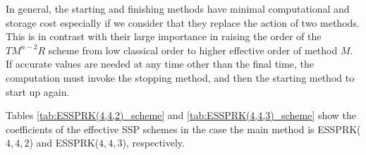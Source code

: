 In general, the starting and finishing methods have minimal computational and storage cost 
especially if we consider that they replace the action of two methods. 
This is in contrast with their large importance in raising the order of the $TM^{n-2}R$ scheme 
from low classical order to higher effective order of method $M$.
If accurate values are needed at any time other than the final time, the computation must invoke 
the stopping method, and then the starting method to start up again. 

Tables \ref{tab:ESSPRK(4,4,2)_scheme} and \ref{tab:ESSPRK(4,4,3)_scheme} show the coefficients 
of the effective SSP schemes in the case the main method is ESSPRK($4,4,2$) and 
ESSPRK($4,4,3$), respectively. 

